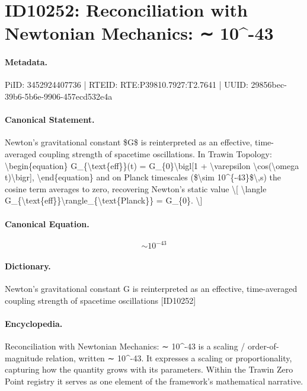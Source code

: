 \section*{ID10252: Reconciliation with Newtonian Mechanics: ∼ 10\textasciicircum{}-43}
\paragraph{Metadata.}
PiID: 3452924407736 | RTEID: RTE:P39810.7927:T2.7641 | UUID: 29856bec-39b6-5b6e-9906-457ecd532e4a

\paragraph{Canonical Statement.}
Newton's gravitational constant \$G\$ is reinterpreted as an effective, time-averaged coupling strength of spacetime oscillations. In Trawin Topology: \textbackslash{}begin\{equation\} G\_\{\textbackslash{}text\{eff\}\}(t) = G\_\{0\}\textbackslash{}bigl[1 + \textbackslash{}varepsilon \textbackslash{}cos(\textbackslash{}omega t)\textbackslash{}bigr], \textbackslash{}end\{equation\} and on Planck timescales (\$\textbackslash{}sim 10\textasciicircum{}\{-43\}\$\textbackslash{},s) the cosine term averages to zero, recovering Newton's static value \textbackslash{}[ \textbackslash{}langle G\_\{\textbackslash{}text\{eff\}\}\textbackslash{}rangle\_\{\textbackslash{}text\{Planck\}\} = G\_\{0\}. \textbackslash{}]

\paragraph{Canonical Equation.}
\[
\sim 10^{-43}
\]

\paragraph{Dictionary.}
Newton's gravitational constant G is reinterpreted as an effective, time-averaged coupling strength of spacetime oscillations [ID10252]

\paragraph{Encyclopedia.}
Reconciliation with Newtonian Mechanics: ∼ 10\textasciicircum{}-43 is a scaling / order-of-magnitude relation, written ∼ 10\textasciicircum{}-43. It expresses a scaling or proportionality, capturing how the quantity grows with its parameters. Within the Trawin Zero Point registry it serves as one element of the framework's mathematical narrative.
